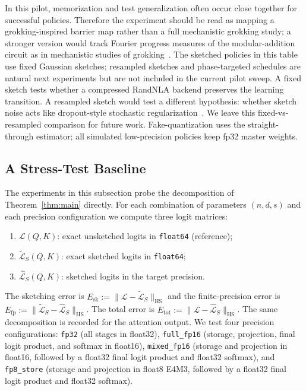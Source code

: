 In this pilot, memorization and test generalization often occur close together for successful policies. Therefore the experiment should be read as mapping a grokking-inspired barrier map rather than a full mechanistic grokking study; a stronger version would track Fourier progress measures of the modular-addition circuit as in mechanistic studies of grokking~\autocite{Nanda2023,PowerEtAl2022}. The sketched policies in this table use fixed Gaussian sketches; resampled sketches and phase-targeted schedules are natural next experiments but are not included in the current pilot sweep. A fixed sketch tests whether a compressed RandNLA backend preserves the learning transition. A resampled sketch would test a different hypothesis: whether sketch noise acts like dropout-style stochastic regularization~\autocite{WanEtAl2013DropConnect}. We leave this fixed-vs-resampled comparison for future work. Fake-quantization uses the straight-through estimator; all simulated low-precision policies keep fp32 master weights.

\subsection{A Stress-Test Baseline}

The experiments in this subsection probe the decomposition of Theorem~\ref{thm:main} directly. For each combination of parameters $(n, d, s)$ and each precision configuration we compute three logit matrices:
\begin{enumerate}
    \item $\mathcal{L}(Q,K)$: exact unsketched logits in \texttt{float64} (reference);
    \item $\widetilde{\mathcal{L}}_S(Q,K)$: exact sketched logits in \texttt{float64};
    \item $\widehat{\mathcal{L}}_S(Q,K)$: sketched logits in the target precision.
\end{enumerate}
The sketching error is $E_{\mathrm{sk}} := \|\mathcal{L} - \widetilde{\mathcal{L}}_S\|_{\mathrm{HS}}$ and the finite-precision error is $E_{\mathrm{fp}} := \|\widetilde{\mathcal{L}}_S - \widehat{\mathcal{L}}_S\|_{\mathrm{HS}}$. The total error is $E_{\mathrm{tot}} := \|\mathcal{L} - \widehat{\mathcal{L}}_S\|_{\mathrm{HS}}$. The same decomposition is recorded for the attention output. We test four precision configurations: \texttt{fp32} (all stages in float32), \texttt{full\_fp16} (storage, projection, final logit product, and softmax in float16), \texttt{mixed\_fp16} (storage and projection in float16, followed by a float32 final logit product and float32 softmax), and \texttt{fp8\_store} (storage and projection in float8 E4M3, followed by a float32 final logit product and float32 softmax).

